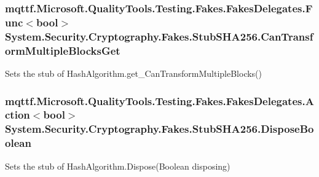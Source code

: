 \hypertarget{class_system_1_1_security_1_1_cryptography_1_1_fakes_1_1_stub_s_h_a256_afd3a3127504129cf9aed301fc715eec0}{
\subsubsection[{Can\-Transform\-Multiple\-Blocks\-Get}]{\setlength{\rightskip}{0pt plus 5cm}mqttf.\-Microsoft.\-Quality\-Tools.\-Testing.\-Fakes.\-Fakes\-Delegates.\-Func$<$bool$>$ System.\-Security.\-Cryptography.\-Fakes.\-Stub\-S\-H\-A256.\-Can\-Transform\-Multiple\-Blocks\-Get}}\label{class_system_1_1_security_1_1_cryptography_1_1_fakes_1_1_stub_s_h_a256_afd3a3127504129cf9aed301fc715eec0}


Sets the stub of Hash\-Algorithm.\-get\-\_\-\-Can\-Transform\-Multiple\-Blocks()

\hypertarget{class_system_1_1_security_1_1_cryptography_1_1_fakes_1_1_stub_s_h_a256_af9a774664bdad2756d21697109cd51ec}{
\subsubsection[{Dispose\-Boolean}]{\setlength{\rightskip}{0pt plus 5cm}mqttf.\-Microsoft.\-Quality\-Tools.\-Testing.\-Fakes.\-Fakes\-Delegates.\-Action$<$bool$>$ System.\-Security.\-Cryptography.\-Fakes.\-Stub\-S\-H\-A256.\-Dispose\-Boolean}}\label{class_system_1_1_security_1_1_cryptography_1_1_fakes_1_1_stub_s_h_a256_af9a774664bdad2756d21697109cd51ec}


Sets the stub of Hash\-Algorithm.\-Dispose(\-Boolean disposing)

